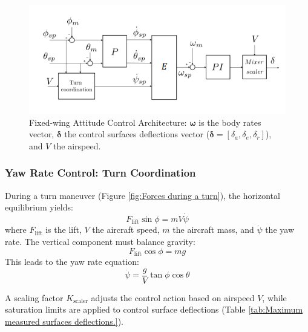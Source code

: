 \begin{figure}[h]
    \centering
    \includegraphics[width=1\linewidth]{Images/pid_cascade_loop.png}
    \caption{Fixed-wing Attitude Control Architecture: $\boldsymbol{\omega}$ is the body rates vector, $\boldsymbol{\delta}$ the control surfaces deflections vector ($\boldsymbol{\delta} = [\delta_a, \delta_e, \delta_r]$), and $V$ the airspeed.}
    \label{fig:pid_cascade_loop}
\end{figure}

\subsubsection{Yaw Rate Control: Turn Coordination}

During a turn maneuver (Figure \ref{fig:Forces during a turn}), the horizontal equilibrium yields:
\begin{equation}
    F_{\text{lift}} \sin \phi = mV \dot{\psi}
\end{equation}
where \( F_{\text{lift}} \) is the lift, \( V \) the aircraft speed, \( m \) the aircraft mass, and \( \dot{\psi} \) the yaw rate. The vertical component must balance gravity:
\begin{equation}
    F_{\text{lift}} \cos \phi = mg
\end{equation}
This leads to the yaw rate equation:
\begin{equation}
    \dot{\psi} = \frac{g}{V} \tan \phi \cos \theta
\end{equation}

A scaling factor \( K_{\text{scaler}} \) adjusts the control action based on airspeed \( V \), while saturation limits are applied to control surface deflections (Table \ref{tab:Maximum measured surfaces deflections.}).


